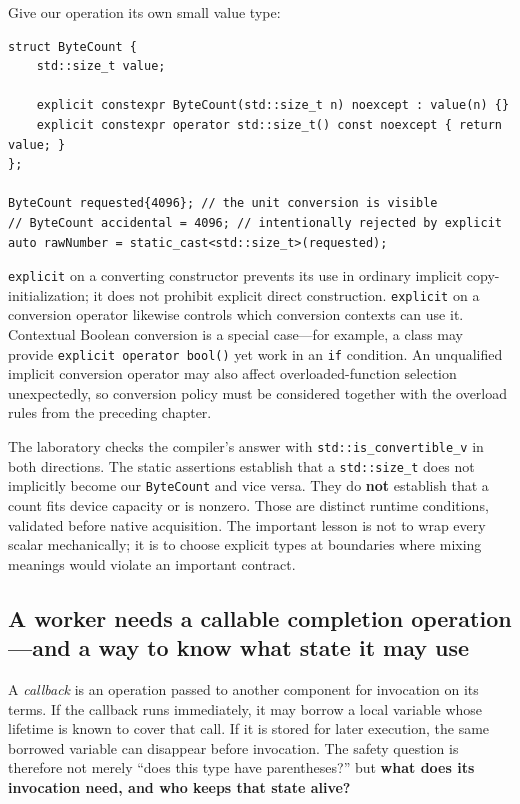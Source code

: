 Give our operation its own small value type:

\begin{verbatim}
struct ByteCount {
    std::size_t value;

    explicit constexpr ByteCount(std::size_t n) noexcept : value(n) {}
    explicit constexpr operator std::size_t() const noexcept { return value; }
};

ByteCount requested{4096}; // the unit conversion is visible
// ByteCount accidental = 4096; // intentionally rejected by explicit
auto rawNumber = static_cast<std::size_t>(requested);
\end{verbatim}

\texttt{explicit} on a converting constructor prevents its use in ordinary implicit copy-initialization; it does not prohibit explicit direct construction. \texttt{explicit} on a conversion operator likewise controls which conversion contexts can use it. Contextual Boolean conversion is a special case---for example, a class may provide \texttt{explicit\ operator\ bool()} yet work in an \texttt{if} condition. An unqualified implicit conversion operator may also affect overloaded-function selection unexpectedly, so conversion policy must be considered together with the overload rules from the preceding chapter.

The laboratory checks the compiler's answer with \texttt{std::is\_convertible\_v} in both directions. The static assertions establish that a \texttt{std::size\_t} does not implicitly become our \texttt{ByteCount} and vice versa. They do \textbf{not} establish that a count fits device capacity or is nonzero. Those are distinct runtime conditions, validated before native acquisition. The important lesson is not to wrap every scalar mechanically; it is to choose explicit types at boundaries where mixing meanings would violate an important contract.

\subsection{A worker needs a callable completion operation---and a way to know what state it may use}\label{05-engine-i-ch004-a-worker-needs-a-callable-completion-operationand-a-way-to-know-what-state-it-may-use}

\hypertarget{05-engine-i-ch004-a-worker-needs-a-callable-completion-operationand-a-way-to-know-what-state-it-may-use}{}

A \emph{callback} is an operation passed to another component for invocation on its terms. If the callback runs immediately, it may borrow a local variable whose lifetime is known to cover that call. If it is stored for later execution, the same borrowed variable can disappear before invocation. The safety question is therefore not merely ``does this type have parentheses?'' but \textbf{what does its invocation need, and who keeps that state alive?}

